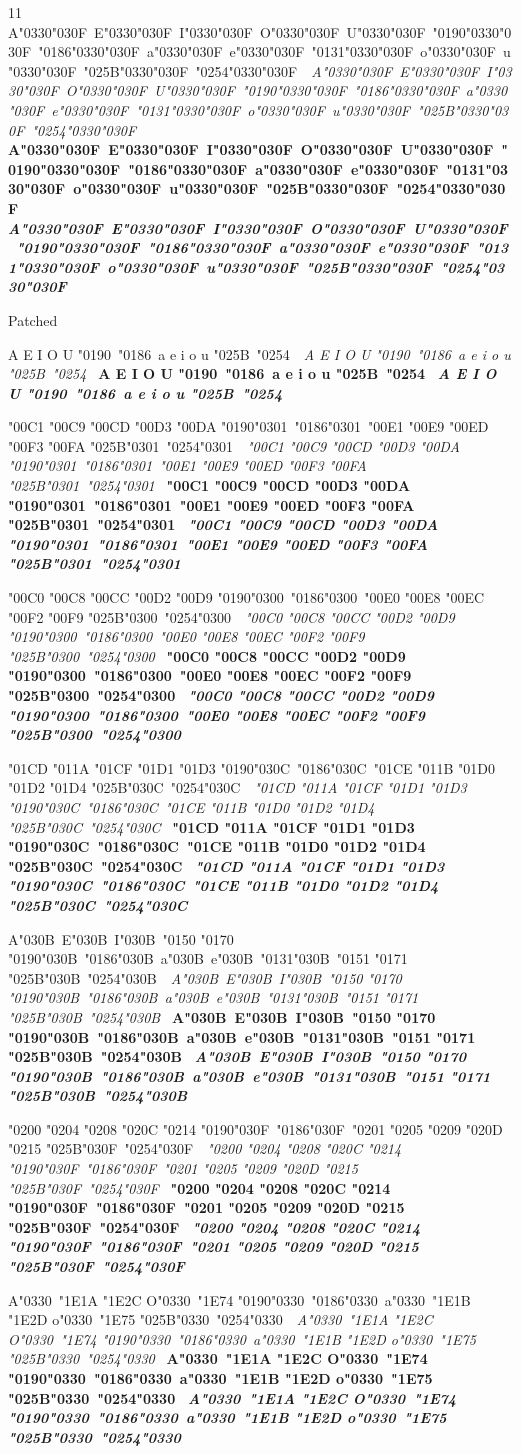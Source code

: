 \documentclass[landscape]{article}
\newcommand{\PREC}[1]{{\color{supportedprec}#1}}
\newcommand{\ribbiline}[1]{#1\ 
	{\itshape #1}
	{\bfseries #1}
	{\itshape\bfseries #1}}
\begin{document}
11 \ribbiline{A\char"0330\char"030F\ 
E\char"0330\char"030F\ 
I\char"0330\char"030F\ 
O\char"0330\char"030F\ 
U\char"0330\char"030F\ 
\char"0190\char"0330\char"030F\ 
\char"0186\char"0330\char"030F\
a\char"0330\char"030F\ 
e\char"0330\char"030F\ 
\char"0131\char"0330\char"030F\ 
o\char"0330\char"030F\ 
u\char"0330\char"030F\ 
\char"025B\char"0330\char"030F\ 
\char"0254\char"0330\char"030F\ }

Patched

{\LibertinusSerifPatch
\ribbiline{A E I O U \char"0190\ \char"0186\ a e i o u \char"025B\ \char"0254\ }

\ribbiline{\PREC{\char"00C1} \PREC{\char"00C9} \PREC{\char"00CD} \PREC{\char"00D3} \PREC{\char"00DA} \char"0190\char"0301\ \char"0186\char"0301\
\PREC{\char"00E1} \PREC{\char"00E9} \PREC{\char"00ED} \PREC{\char"00F3} \PREC{\char"00FA} \char"025B\char"0301\ \char"0254\char"0301\ }

\ribbiline{\PREC{\char"00C0} \PREC{\char"00C8} \PREC{\char"00CC} \PREC{\char"00D2} \PREC{\char"00D9} \char"0190\char"0300\ \char"0186\char"0300\
\PREC{\char"00E0} \PREC{\char"00E8} \PREC{\char"00EC} \PREC{\char"00F2} \PREC{\char"00F9} \char"025B\char"0300\ \char"0254\char"0300\ }

\ribbiline{\PREC{\char"01CD} \PREC{\char"011A} \PREC{\char"01CF} \PREC{\char"01D1} \PREC{\char"01D3} \char"0190\char"030C\ \char"0186\char"030C\
\PREC{\char"01CE} \PREC{\char"011B} \PREC{\char"01D0} \PREC{\char"01D2} \PREC{\char"01D4} \char"025B\char"030C\ \char"0254\char"030C\ }

\ribbiline{A\char"030B\ E\char"030B\ I\char"030B\ \PREC{\char"0150} \PREC{\char"0170} \char"0190\char"030B\ \char"0186\char"030B\
a\char"030B\ e\char"030B\ \char"0131\char"030B\ \PREC{\char"0151} \PREC{\char"0171} \char"025B\char"030B\ \char"0254\char"030B\ }

\ribbiline{\PREC{\char"0200} \PREC{\char"0204} \PREC{\char"0208} \PREC{\char"020C} \PREC{\char"0214} \char"0190\char"030F\ \char"0186\char"030F\
\PREC{\char"0201} \PREC{\char"0205} \PREC{\char"0209} \PREC{\char"020D} \PREC{\char"0215} \char"025B\char"030F\ \char"0254\char"030F\ }

\ribbiline{A\char"0330\ \PREC{\char"1E1A} \PREC{\char"1E2C} O\char"0330\ \PREC{\char"1E74} \char"0190\char"0330\ \char"0186\char"0330\
a\char"0330\ \PREC{\char"1E1B} \PREC{\char"1E2D} o\char"0330\ \PREC{\char"1E75} \char"025B\char"0330\ \char"0254\char"0330\ }

}
\end{document}
